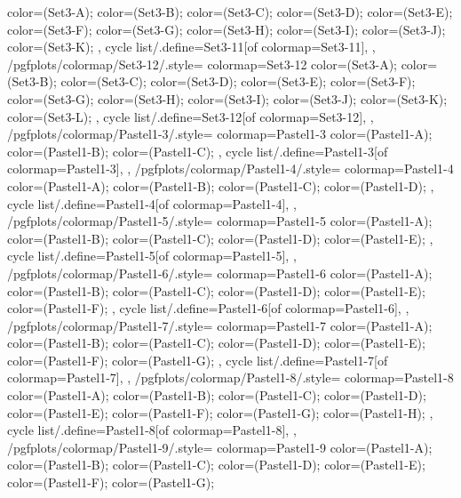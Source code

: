 {{{      color=(Set3-A);
      color=(Set3-B);
      color=(Set3-C);
      color=(Set3-D);
      color=(Set3-E);
      color=(Set3-F);
      color=(Set3-G);
      color=(Set3-H);
      color=(Set3-I);
      color=(Set3-J);
      color=(Set3-K);
    },
    cycle list/.define={Set3-11}{[of colormap=Set3-11]},
  },
  /pgfplots/colormap/Set3-12/.style={
    colormap={Set3-12}{
      color=(Set3-A);
      color=(Set3-B);
      color=(Set3-C);
      color=(Set3-D);
      color=(Set3-E);
      color=(Set3-F);
      color=(Set3-G);
      color=(Set3-H);
      color=(Set3-I);
      color=(Set3-J);
      color=(Set3-K);
      color=(Set3-L);
    },
    cycle list/.define={Set3-12}{[of colormap=Set3-12]},
  },
  /pgfplots/colormap/Pastel1-3/.style={
    colormap={Pastel1-3}{
      color=(Pastel1-A);
      color=(Pastel1-B);
      color=(Pastel1-C);
    },
    cycle list/.define={Pastel1-3}{[of colormap=Pastel1-3]},
  },
  /pgfplots/colormap/Pastel1-4/.style={
    colormap={Pastel1-4}{
      color=(Pastel1-A);
      color=(Pastel1-B);
      color=(Pastel1-C);
      color=(Pastel1-D);
    },
    cycle list/.define={Pastel1-4}{[of colormap=Pastel1-4]},
  },
  /pgfplots/colormap/Pastel1-5/.style={
    colormap={Pastel1-5}{
      color=(Pastel1-A);
      color=(Pastel1-B);
      color=(Pastel1-C);
      color=(Pastel1-D);
      color=(Pastel1-E);
    },
    cycle list/.define={Pastel1-5}{[of colormap=Pastel1-5]},
  },
  /pgfplots/colormap/Pastel1-6/.style={
    colormap={Pastel1-6}{
      color=(Pastel1-A);
      color=(Pastel1-B);
      color=(Pastel1-C);
      color=(Pastel1-D);
      color=(Pastel1-E);
      color=(Pastel1-F);
    },
    cycle list/.define={Pastel1-6}{[of colormap=Pastel1-6]},
  },
  /pgfplots/colormap/Pastel1-7/.style={
    colormap={Pastel1-7}{
      color=(Pastel1-A);
      color=(Pastel1-B);
      color=(Pastel1-C);
      color=(Pastel1-D);
      color=(Pastel1-E);
      color=(Pastel1-F);
      color=(Pastel1-G);
    },
    cycle list/.define={Pastel1-7}{[of colormap=Pastel1-7]},
  },
  /pgfplots/colormap/Pastel1-8/.style={
    colormap={Pastel1-8}{
      color=(Pastel1-A);
      color=(Pastel1-B);
      color=(Pastel1-C);
      color=(Pastel1-D);
      color=(Pastel1-E);
      color=(Pastel1-F);
      color=(Pastel1-G);
      color=(Pastel1-H);
    },
    cycle list/.define={Pastel1-8}{[of colormap=Pastel1-8]},
  },
  /pgfplots/colormap/Pastel1-9/.style={
    colormap={Pastel1-9}{
      color=(Pastel1-A);
      color=(Pastel1-B);
      color=(Pastel1-C);
      color=(Pastel1-D);
      color=(Pastel1-E);
      color=(Pastel1-F);
      color=(Pastel1-G);
}}}
